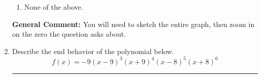 \documentclass{extbook}[14pt]
\newcommand{\litem}[1]{\item #1

\rule{\textwidth}{0.4pt}}
\begin{document}
\begin{enumerate}
{\begin{enumerate}[label=\Alph*.]
\item None of the above.\end{enumerate}
\textbf{General Comment:} You will need to sketch the entire graph, then zoom in on the zero the question asks about.
}
\litem{
Describe the end behavior of the polynomial below.
\[ f(x) = -9(x - 9)^{3}(x + 9)^{4}(x - 8)^{5}(x + 8)^{6} \]

}
\end{enumerate}
\end{document}
